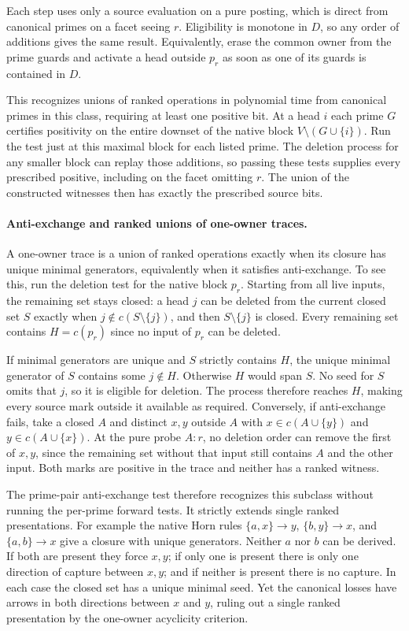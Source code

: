 Each step uses only a source evaluation on a pure posting,
which is direct from canonical primes on a facet seeing $r$.
Eligibility is monotone in $D$, so any order of additions
gives the same result. Equivalently, erase the common owner
from the prime guards and activate a head outside $p_r$ as
soon as one of its guards is contained in $D$.

This recognizes unions of ranked operations in polynomial time
from canonical primes in this class, requiring at least one
positive bit. At a head $i$ each prime
$G$ certifies positivity on the entire downset of the native
block $V\setminus(G\cup\{i\})$. Run the test just at this
maximal block for each listed prime. The deletion process for
any smaller block can replay those additions, so passing these
tests supplies every prescribed positive, including on the
facet omitting $r$. The union of the constructed witnesses
then has exactly the prescribed source bits.

\paragraph{Anti-exchange and ranked unions of one-owner traces.}
A one-owner trace is a union of ranked operations exactly
when its closure has unique minimal generators, equivalently
when it satisfies anti-exchange. To see this, run the deletion
test for the native block $p_r$. Starting from all live inputs,
the remaining set stays closed: a head $j$ can be deleted
from the current closed set $S$ exactly when
$j\notin c(S\setminus\{j\})$, and then $S\setminus\{j\}$
is closed. Every remaining set contains $H=c(p_r)$ since
no input of $p_r$ can be deleted.

If minimal generators are unique and $S$ strictly contains
$H$, the unique minimal generator of $S$ contains some
$j\notin H$. Otherwise $H$ would span $S$. No seed for $S$
omits that $j$, so it is eligible for deletion. The process
therefore reaches $H$, making every source mark outside it
available as required. Conversely, if anti-exchange fails,
take a closed $A$ and distinct $x,y$ outside $A$ with
$x\in c(A\cup\{y\})$ and $y\in c(A\cup\{x\})$.
At the pure probe $A:r$, no deletion order can remove
the first of $x,y$, since the remaining set without that
input still contains $A$ and the other input. Both marks
are positive in the trace and neither has a ranked witness.

The prime-pair anti-exchange test therefore recognizes this
subclass without running the per-prime forward tests.
It strictly extends single ranked presentations. For
example the native Horn rules
$\{a,x\}\to y$, $\{b,y\}\to x$, and $\{a,b\}\to x$
give a closure with unique generators. Neither $a$ nor $b$
can be derived. If both are present they force $x,y$;
if only one is present there is only one direction of
capture between $x,y$; and if neither is present there
is no capture. In each case the closed set has a unique
minimal seed. Yet the canonical losses have arrows in
both directions between $x$ and $y$, ruling out a single
ranked presentation by the one-owner acyclicity criterion.

